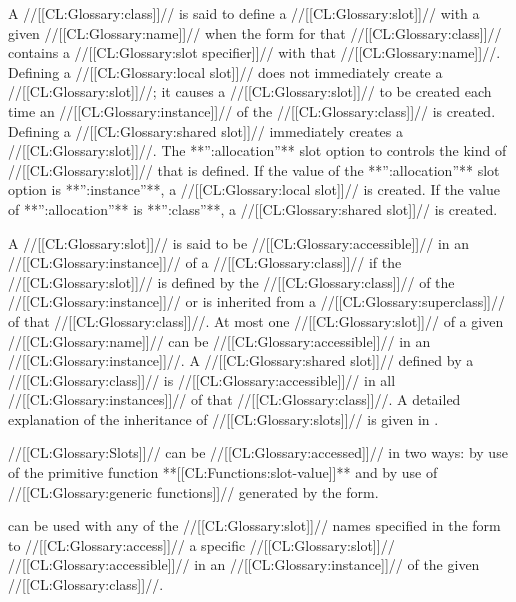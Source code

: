 A //[[CL:Glossary:class]]// is said to define a //[[CL:Glossary:slot]]// with a given //[[CL:Glossary:name]]// when the  form for that //[[CL:Glossary:class]]// contains a //[[CL:Glossary:slot specifier]]// with that //[[CL:Glossary:name]]//.  Defining a //[[CL:Glossary:local slot]]// does not immediately create  a //[[CL:Glossary:slot]]//; it causes a //[[CL:Glossary:slot]]// to be created each time  an //[[CL:Glossary:instance]]// of the //[[CL:Glossary:class]]// is created. Defining a //[[CL:Glossary:shared slot]]// immediately creates a //[[CL:Glossary:slot]]//.
                                                     The **'':allocation''** slot option to  controls the kind of //[[CL:Glossary:slot]]// that is defined.  If the value of the **'':allocation''** slot option is **'':instance''**, a //[[CL:Glossary:local slot]]// is created.  If the value of **'':allocation''** is **'':class''**, a //[[CL:Glossary:shared slot]]// is created.

A //[[CL:Glossary:slot]]// is said to be //[[CL:Glossary:accessible]]// in an //[[CL:Glossary:instance]]//  of a //[[CL:Glossary:class]]// if the //[[CL:Glossary:slot]]// is defined by the //[[CL:Glossary:class]]//  of the //[[CL:Glossary:instance]]// or is inherited from a //[[CL:Glossary:superclass]]// of that //[[CL:Glossary:class]]//.   At most one //[[CL:Glossary:slot]]// of a given //[[CL:Glossary:name]]// can be //[[CL:Glossary:accessible]]// in an //[[CL:Glossary:instance]]//.   A //[[CL:Glossary:shared slot]]// defined by a //[[CL:Glossary:class]]// is //[[CL:Glossary:accessible]]// in all //[[CL:Glossary:instances]]//  of that //[[CL:Glossary:class]]//.   A detailed explanation of the inheritance of //[[CL:Glossary:slots]]// is given in  \secref\SlotInheritance.

\endsubSection%

//[[CL:Glossary:Slots]]// can be //[[CL:Glossary:accessed]]// in two ways: by use of the primitive function **[[CL:Functions:slot-value]]** and by use of //[[CL:Glossary:generic functions]]// generated by the  form.

 can be used with any of the //[[CL:Glossary:slot]]// names specified in the  form to //[[CL:Glossary:access]]// a specific //[[CL:Glossary:slot]]// //[[CL:Glossary:accessible]]// in an //[[CL:Glossary:instance]]// of the given //[[CL:Glossary:class]]//.

